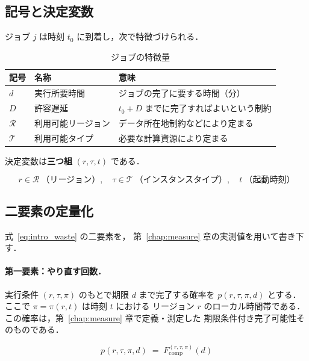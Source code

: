 \documentclass[11pt,a4paper]{ltjsreport}
\newcommand{\Fcomp}{F_{\mathrm{comp}}}
\begin{document}
\subsection{記号と決定変数}

ジョブ $j$ は時刻 $t_0$ に到着し，次で特徴づけられる．

\begin{table}[htbp]
\centering
\caption{ジョブの特徴量}
\label{tab:job}
\small
\begin{tabularx}{\textwidth}{@{}llX@{}}
\toprule
記号 & 名称 & 意味 \\
\midrule
$d$ & 実行所要時間 & ジョブの完了に要する時間（分） \\
$D$ & 許容遅延 & $t_0 + D$ までに完了すればよいという制約 \\
$\mathcal{R}$ & 利用可能リージョン & データ所在地制約などにより定まる \\
$\mathcal{T}$ & 利用可能タイプ & 必要な計算資源により定まる \\
\bottomrule
\end{tabularx}
\end{table}

決定変数は\textbf{三つ組} $(r, \tau, t)$ である．

\begin{equation}
r \in \mathcal{R}\ \text{（リージョン）},\quad
\tau \in \mathcal{T}\ \text{（インスタンスタイプ）},\quad
t\ \text{（起動時刻）}
\end{equation}

\subsection{二要素の定量化}

式~\eqref{eq:intro_waste} の二要素を，
第~\ref{chap:measure} 章の実測値を用いて書き下す．

\paragraph{第一要素：やり直す回数．}
実行条件 $(r,\tau,\pi)$ のもとで期限 $d$ まで完了する確率を
$p(r,\tau,\pi,d)$ とする．
ここで $\pi = \pi(r,t)$ は時刻 $t$ における
リージョン $r$ のローカル時間帯である．
この確率は，第~\ref{chap:measure} 章で定義・測定した
期限条件付き完了可能性そのものである．

\begin{equation}
p(r,\tau,\pi,d) \;=\; \Fcomp^{(r,\tau,\pi)}(d)
\label{eq:p_is_fcomp}
\end{equation}
\end{document}
